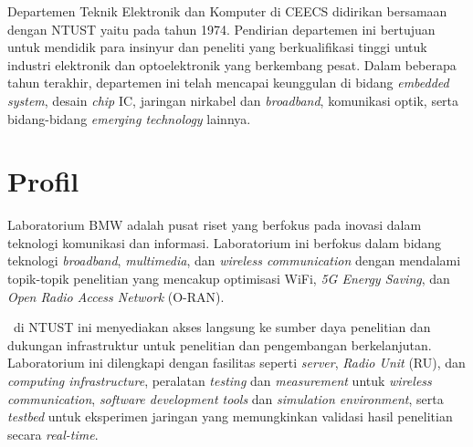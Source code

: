 Departemen Teknik Elektronik dan Komputer di CEECS didirikan bersamaan dengan NTUST yaitu pada tahun 1974. Pendirian departemen ini bertujuan untuk mendidik para insinyur dan peneliti yang berkualifikasi tinggi untuk industri elektronik dan optoelektronik yang berkembang pesat. Dalam beberapa tahun terakhir, departemen ini telah mencapai keunggulan di bidang \textit{embedded system}, desain \textit{chip} IC, jaringan nirkabel dan \textit{broadband}, komunikasi optik, serta bidang-bidang \textit{emerging technology} lainnya.

\section{Profil \namaLab}

Laboratorium BMW adalah pusat riset yang berfokus pada inovasi dalam teknologi komunikasi dan informasi. Laboratorium ini berfokus dalam bidang teknologi \textit{broadband}, \textit{multimedia}, dan \textit{wireless communication} dengan mendalami topik-topik penelitian yang mencakup optimisasi WiFi, \textit{5G Energy Saving}, dan \textit{Open Radio Access Network} (O-RAN).

\namaLab \ di NTUST ini menyediakan akses langsung ke sumber daya penelitian dan dukungan infrastruktur untuk penelitian dan pengembangan berkelanjutan. Laboratorium ini dilengkapi dengan fasilitas seperti \textit{server}, \textit{Radio Unit} (RU), dan \textit{computing infrastructure}, peralatan \textit{testing} dan \textit{measurement} untuk \textit{wireless communication}, \textit{software development tools} dan \textit{simulation environment}, serta \textit{testbed} untuk eksperimen jaringan yang memungkinkan validasi hasil penelitian secara \textit{real-time}.
